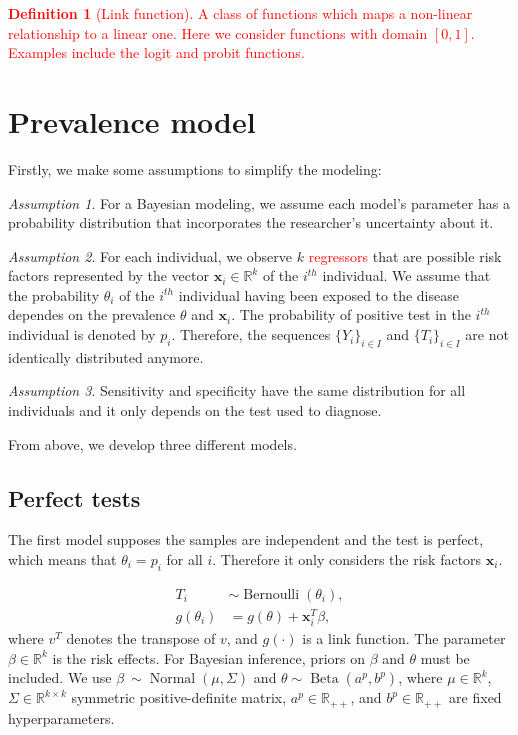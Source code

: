 \documentclass[a4paper, notitlepage, 11pt]{article}
\newcommand{\R}{\mathbb{R}}
\newcommand{\x}{\boldsymbol{x}}
\newcommand{\N}{\operatorname{Normal}}
\newcommand{\betadist}{\operatorname{Beta}}
\theoremstyle{definition}
\newtheorem{definition}{Definition}[section]
\theoremstyle{remark}
\newtheorem{assumption}{Assumption}
\newcommand{\improve}[1]{\textcolor{red}{#1}}
\begin{document}
\improve{\begin{definition}[Link function]
  A class of functions which maps a non-linear relationship to a linear one.
  Here we consider functions with domain $[0,1]$. Examples include the logit
  and probit functions.
\end{definition}}

\section{Prevalence model}

Firstly, we make some assumptions to simplify the modeling:

\begin{assumption}  
  For a Bayesian modeling, we assume each model's parameter has a probability distribution that incorporates the researcher's uncertainty about it. 
\end{assumption}

\begin{assumption}
  For each individual, we observe $k$ \improve{regressors} that are possible
  risk factors represented by the vector $\x_i \in \R^{k}$ of the $i^{th}$
  individual. We assume that the probability $\theta_i$ of the $i^{th}$ individual having been exposed
  to the disease dependes on the prevalence $\theta$ and $\x_i$. The
  probability of positive test in the $i^{th}$ individual is denoted by $p_i$. Therefore, the sequences $\{Y_i\}_{i \in I}$ and $\{T_i\}_{i \in I}$ are not
  identically distributed anymore.
\end{assumption}

\begin{assumption}
  Sensitivity and specificity have the same distribution for all
  individuals and it only depends on the test used to diagnose. 
\end{assumption}

From above, we develop three different models.

\subsection{Perfect tests}

The first model supposes the samples are independent and the test is perfect,
which means that $\theta_i = p_i$ for all $i$. Therefore it only considers the risk factors $\x_i$. 

\begin{equation}
  \begin{aligned}
    T_i &\sim \operatorname{Bernoulli}(\theta_i), \\
    g(\theta_i) &= g(\theta) + \x_i^T\beta, 
  \end{aligned}  
\end{equation}
where $v^T$ denotes the transpose of $v$, and $g(\cdot)$ is a link function.
The parameter $\beta \in \R^{k}$ is the risk effects. For Bayesian inference, priors on
$\beta$ and $\theta$ must be included. We use $\beta ~ \sim \N(\mu, \Sigma)$
and $\theta \sim \betadist(a^{p}, b^p)$, where $\mu
\in \R^{k}$, $\Sigma \in \R^{k\times k}$ symmetric positive-definite matrix,
$a^p \in \R_{++}$, and $b^p \in \R_{++}$
are fixed hyperparameters. 
\end{document}

